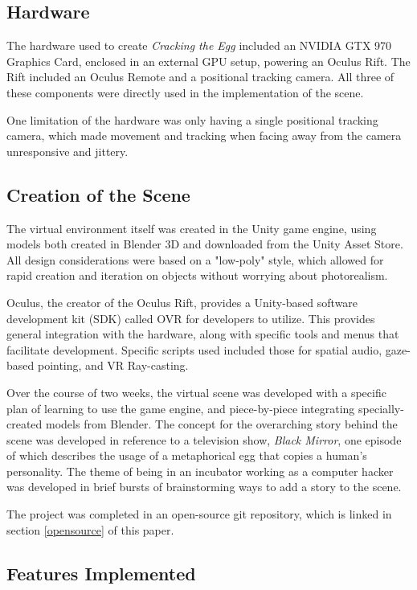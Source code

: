 \documentclass[10pt,twocolumn,letterpaper]{article}
\begin{document}
\subsection{Hardware}

The hardware used to create \textit{Cracking the Egg} included an NVIDIA GTX 970 Graphics Card, enclosed in an external GPU setup, powering an Oculus Rift. The Rift included an Oculus Remote and a positional tracking camera. All three of these components were directly used in the implementation of the scene.

One limitation of the hardware was only having a single positional tracking camera, which made movement and tracking when facing away from the camera unresponsive and jittery.

\subsection{Creation of the Scene}

The virtual environment itself was created in the Unity game engine, using models both created in Blender 3D and downloaded from the Unity Asset Store. All design considerations were based on a "low-poly" style, which allowed for rapid creation and iteration on objects without worrying about photorealism.

Oculus, the creator of the Oculus Rift, provides a Unity-based software development kit (SDK) called OVR for developers to utilize. This provides general integration with the hardware, along with specific tools and menus that facilitate development. Specific scripts used included those for spatial audio, gaze-based pointing, and VR Ray-casting.

Over the course of two weeks, the virtual scene was developed with a specific plan of learning to use the game engine, and piece-by-piece integrating specially-created models from Blender. The concept for the overarching story behind the scene was developed in reference to a television show, \textit{Black Mirror}, one episode of which describes the usage of a metaphorical egg that copies a human's personality. The theme of being in an incubator working as a computer hacker was developed in brief bursts of brainstorming ways to add a story to the scene.

The project was completed in an open-source git repository, which is linked in section \ref{opensource} of this paper.

\subsection{Features Implemented}
\end{document}
